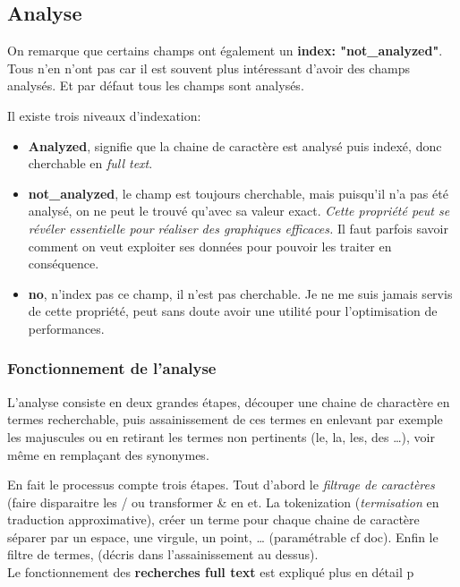 {\subsection{Analyse}
On remarque que certains champs ont également un \textbf{index: "not\_analyzed"}.
Tous n'en n'ont pas car il est souvent plus intéressant d'avoir des champs analysés.
Et par défaut tous les champs sont analysés.

Il existe trois niveaux d'indexation:
\begin{itemize}
    \item   \textbf{Analyzed}, signifie que la chaine de caractère est analysé puis indexé,
    donc cherchable en \textit{full text}.
    \item   \textbf{not\_analyzed}, le champ est toujours cherchable, mais puisqu'il n'a pas 
    été analysé, on ne peut le trouvé qu'avec sa valeur exact. \emph{Cette propriété
    peut se révéler essentielle pour réaliser des graphiques efficaces.} 
    \footnotesize{Il faut parfois savoir comment on veut exploiter ses données pour
    pouvoir les traiter en conséquence.}
    \item \textbf{no}, n'index pas ce champ, il n'est pas cherchable. Je ne me suis
    jamais servis de cette propriété, peut sans doute avoir une utilité pour l'optimisation
    de performances.
\end{itemize}

\subsubsection{Fonctionnement de l'analyse}
L'analyse consiste en deux grandes étapes, découper une chaine de charactère en termes
recherchable, puis assainissement de ces termes en enlevant par exemple les majuscules
ou en retirant les termes non pertinents (le, la, les, des \ldots), voir même en 
remplaçant des synonymes.

En fait le processus compte trois étapes. Tout d'abord le \emph{filtrage de caractères}
(faire disparaitre les / ou transformer \& en et. La tokenization (\textit{termisation}
en traduction approximative), créer un terme pour chaque chaine de caractère séparer
par un espace, une virgule, un point, \ldots{} (paramétrable cf doc). Enfin le filtre
de termes, (décris dans l'assainissement au dessus).\\[2mm]

Le fonctionnement des \textbf{recherches full text} est expliqué plus en détail p\pageref{subsec:elasticfulltext}


}
